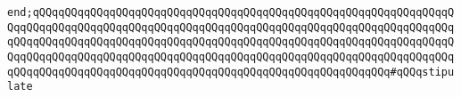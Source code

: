 \verb|end;qQQqqQQqqQQqqQQqqQQqqQQqqQQqqQQqqQQqqQQqqQQqqQQqqQQqqQQqqQQqqQQqqQQqqQQqqQQqqQQqqQQqqQQqqQQqqQQqqQQqqQQqqQQqqQQqqQQqqQQqqQQqqQQqqQQqqQQqqQQqqQQqqQQqqQQqqQQqqQQqqQQqqQQqqQQqqQQqqQQqqQQqqQQqqQQqqQQqqQQqqQQqqQQqqQQqqQQqqQQqqQQqqQQqqQQqqQQqqQQqqQQqqQQqqQQqqQQqqQQqqQQqqQQqqQQqqQQqqQQqqQQqqQQqqQQqqQQqqQQqqQQqqQQqqQQqqQQqqQQqqQQqqQQqqQQqqQQq#qQQqstipulate|\newline

